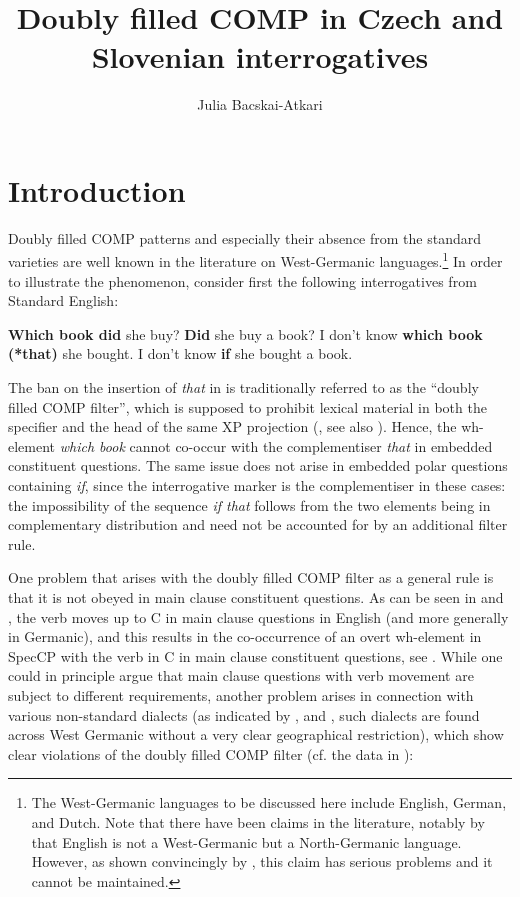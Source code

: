 \documentclass[output=paper,modfonts, hidelinks, newtxmath]{langscibook}
\title{Doubly filled COMP in Czech and Slovenian interrogatives}
\author{Julia Bacskai-Atkari\affiliation{University of Potsdam}}
\begin{document}
\maketitle
{}
\section{Introduction} 
Doubly filled COMP patterns and especially their absence from the standard varieties are well known in the literature on West-Germanic languages.\footnote{The West-Germanic languages to be discussed here include English, German, and Dutch. Note that there have been claims in the literature, notably by \citet{emondsfaarlund2014} that English is not a West-Germanic but a North-Germanic language. However, as shown convincingly by \citet{bechwalkden2016}, this claim has serious problems and it cannot be maintained.} In order to illustrate the phenomenon, consider first the following interrogatives from Standard English:

\ea
	\ea \textbf{Which book did} she buy? \label{whichbookdid}
	\ex \textbf{Did} she buy a book? \label{did}
	\ex I don't know \textbf{which book (*that)} she bought. \label{whichbook}
	\ex I don't know \textbf{if} she bought a book. \label{if}
	\z
\z

\noindent The ban on the insertion of \textit{that} in  is traditionally referred to as the ``doubly filled COMP filter'', which is supposed to prohibit lexical material in both the specifier and the head of the same XP projection (\citealt[446]{chomskylasnik1977}, see also \citealt{koopman2000}). Hence, the wh-element \textit{which book} cannot co-occur with the complementiser \textit{that} in embedded constituent questions. The same issue does not arise in embedded polar questions containing \textit{if}, since the interrogative marker is the complementiser in these cases: the impossibility of the sequence \textit{if that} follows from the two elements being in complementary distribution and need not be accounted for by an additional filter rule.

One problem that arises with the doubly filled COMP filter as a general rule is that it is not obeyed in main clause constituent questions. As can be seen in  and , the verb moves up to C in main clause questions in English (and more generally in Germanic), and this results in the co-occurrence of an overt wh-element in SpecCP with the verb in C in main clause constituent questions, see . While one could in principle argue that main clause questions with verb movement are subject to different requirements, another problem arises in connection with various non-standard dialects (as indicated by \citealt{vangelderen2009}, \citealt{bayer2004} and \citealt{bayerbrandner2008}, such dialects are found across West Germanic without a very clear geographical restriction), which show clear violations of the doubly filled COMP filter (cf. the data in \citealt{baltin2010}):
\end{document}
